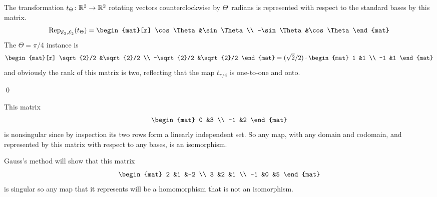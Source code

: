 \documentclass[10pt,t]{beamer}
\begin{document}
\begin{frame}
\ex
The transformation $\mbox{$t_\Theta\colon \mathbb{R}^2\to \mathbb{R}^2$}$ rotating vectors 
counterclockwise by $\Theta$~radians is represented with respect to the
standard bases by this matrix.
\begin{equation*}
  \rep{t_\Theta}{\stdbasis_2,\stdbasis_2}
  =
  \begin{mat}[r]
    \cos\Theta  &\sin\Theta  \\
   -\sin\Theta  &\cos\Theta
  \end{mat}
\end{equation*}
The $\Theta=\pi/4$ instance is
\begin{equation*}
  \begin{mat}[r]
    \sqrt{2}/2  &\sqrt{2}/2  \\
   -\sqrt{2}/2  &\sqrt{2}/2
  \end{mat}
  =(\sqrt{2}/2)\cdot
  \begin{mat}
    1  &1  \\
   -1  &1
  \end{mat}
\end{equation*}
and obviously the rank of this matrix is two, reflecting
that the map $t_{\pi/4}$ is one-to-one and onto. 
\end{frame}




\begin{frame}
\df[df:NonsingularMap]




\pause
\lm[le:NonsingMatIffNonsingMap]
\pause
\pf
{}

\pause
{}
\qed
\end{frame}




\begin{frame}
\ex
This matrix
\begin{equation*}
  \begin{mat}
    0  &3  \\
   -1  &2
  \end{mat}
\end{equation*}
is nonsingular since by inspection its two rows form a linearly independent
set.
So any map, with any domain and codomain, and represented by this matrix  
with respect to any bases,
is an isomorphism.

\pause
\ex
Gauss's method will show that this matrix
\begin{equation*}
  \begin{mat}
    2  &1  &-2  \\
    3  &2  &1   \\
   -1  &0  &5
  \end{mat}
\end{equation*}
is singular so any map that it represents will be a homomorphism that
is not an isomorphism.
\end{frame}




% 
\end{document}
